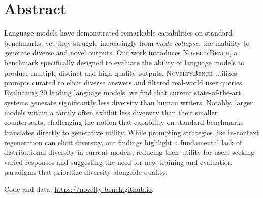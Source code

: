 
\section{Abstract}
\label{sec-abstract}
Language models have demonstrated remarkable capabilities on standard benchmarks, yet they struggle increasingly from \emph{mode collapse}, the inability to generate diverse and novel outputs.
Our work introduces \textsc{NoveltyBench}, a benchmark specifically designed to evaluate the ability of language models to produce multiple distinct and high-quality outputs.
\textsc{NoveltyBench} utilizes prompts curated to elicit diverse answers and filtered real-world user queries.
Evaluating 20 leading language models, we find that current state-of-the-art systems generate significantly less diversity than human writers.
Notably, larger models within a family often exhibit less diversity than their smaller counterparts, challenging the notion that capability on standard benchmarks translates directly to generative utility.
While prompting strategies like in-context regeneration can elicit diversity, our findings highlight a fundamental lack of distributional diversity in current models, reducing their utility for users seeking varied responses and suggesting the need for new training and evaluation paradigms that prioritize diversity alongside quality.

Code and data: \url{https://novelty-bench.github.io}.
